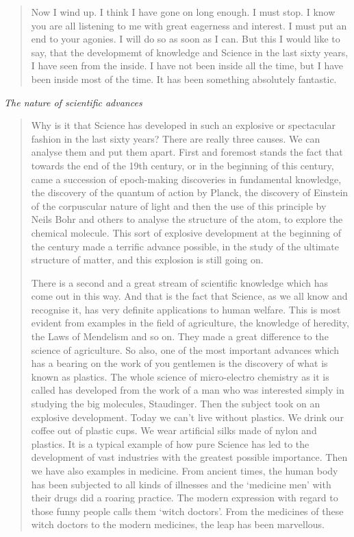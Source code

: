 \begin{quote}
{Now I wind up. I think I have gone on long enough. I must stop. I know you are all listening to me with great eagerness and interest. I must put an end to your agonies. I will do so as soon as I can. But this I would like to say, that the developmemt of knowledge and Science in the last sixty years, I have seen from the inside. I have not been inside all the time, but I have been inside most of the time. It has been something absolutely fantastic.
}\relax
\end{quote}

\medskip
\noindent
{\em The nature of scientific advances}
\begin{quote}
{\fontsize{10pt}{11.7pt}\selectfont
Why is it that Science has developed in such an explosive or spectacular fashion in the last sixty years? There are really three causes. We can analyse them and put them apart. First and foremost stands the fact that towards the end of the 19th century, or in the beginning of this century, came a succession of epoch-making discoveries in fundamental knowledge, the discovery of the quantum of action by Planck, the discovery of Einstein of the corpuscular nature of light and then the use of this principle by Neils Bohr and others to analyse the structure of the atom, to explore the chemical molecule. This sort of explosive development at the beginning of the century made a terrific advance possible, in the study of the ultimate structure of matter, and this explosion is still going on.

There is a second and a great stream of scientific knowledge which has come out in this way. And that is the fact that Science, as we all know and recognise it, has very definite applications to human welfare. This is most evident from examples in the field of agriculture, the knowledge of heredity, the Laws of Mendelism and so on. They made a great difference to the science of agriculture. So also, one of the most important advances which has a bearing on the work of you gentlemen is the discovery of what is known as plastics. The whole science of micro-electro chemistry as it is called has developed from the work of a man who was interested simply in studying the big molecules, Staudinger. Then the subject took on an explosive development. Today we can't live without plastics. We drink our coffee out of plastic cups. We wear artificial silks made of nylon and plastics. It is a typical example of how pure Science has led to the development of vast industries with the greatest possible importance. Then we have also examples in medicine. From ancient times, the human body has been subjected to all kinds of illnesses and the `medicine men' with their drugs did a roaring practice. The modern expression with regard to those funny people calls them `witch doctors'. From the medicines of these witch doctors to the modern medicines, the leap has been marvellous.

}
\end{quote}
